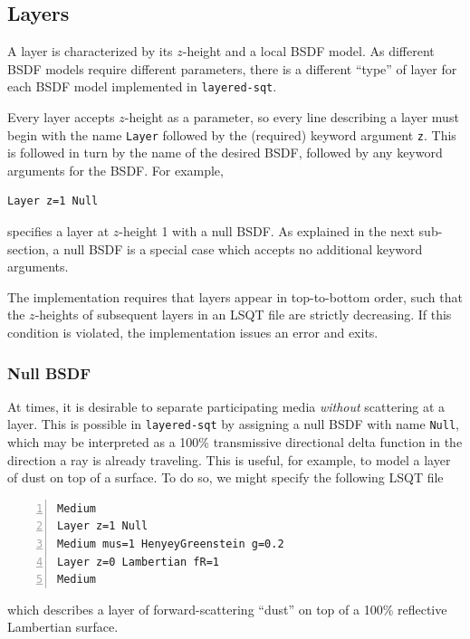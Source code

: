 \documentclass[
    twoside,
    twocolumn,
    letterpaper,
    10pt]{article}
\newcommand\namett[2]{{\color{code#1}\texttt{#2}}}
\begin{document}
\subsection{Layers}
\label{sec:doc-layers}

A layer is characterized by its $z$-height and 
a local BSDF model. As different BSDF models require different 
parameters, there is a different ``type'' of layer for each 
BSDF model implemented in \texttt{layered-sqt}. 

Every layer accepts $z$-height as a parameter, so every line describing a 
layer must begin with the name \namett{blue}{Layer} followed by the (required)
keyword argument \texttt{z}. This is followed in turn by the name of the 
desired BSDF, followed by any keyword arguments for the BSDF. For example,
\begin{lstlisting}
Layer z=1 Null
\end{lstlisting}
specifies a layer at $z$-height 1 with a null BSDF. As explained in 
the next sub-section, a null BSDF is a special case which accepts no additional
keyword arguments.

The implementation requires that layers appear in top-to-bottom order,
such that the $z$-heights of subsequent layers in an LSQT file are
strictly decreasing. If this condition 
is violated, the implementation issues an error and exits.

\subsubsection{Null BSDF}
\label{sec:doc-layers-null}

At times, it is desirable to separate participating media 
\emph{without} scattering at a layer. This is possible in
\texttt{layered-sqt} by assigning a null BSDF with name 
\namett{purple}{Null}, which may be interpreted as a 100\% 
transmissive directional delta function in the direction a 
ray is already traveling. This is useful, for example, to model a 
layer of dust on top of a surface. To do so, we might specify the 
following LSQT file
\begin{lstlisting}[numbers=left]
Medium
Layer z=1 Null
Medium mus=1 HenyeyGreenstein g=0.2
Layer z=0 Lambertian fR=1
Medium
\end{lstlisting}
which describes a layer of forward-scattering ``dust'' on top 
of a 100\% reflective Lambertian surface.
\end{document}
